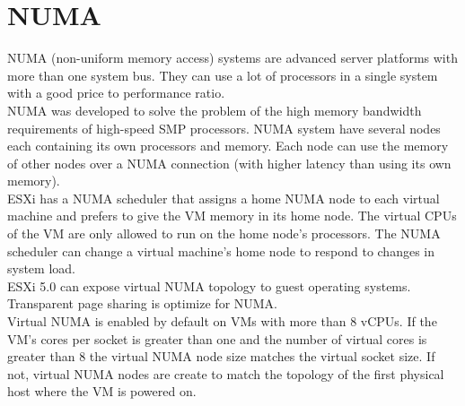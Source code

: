\section{NUMA}

NUMA (non-uniform memory access) systems are advanced server platforms with
more than one system bus. They can use a lot of processors in a single system
with a good price to performance ratio.\\

NUMA was developed to solve the problem of the high memory bandwidth
requirements of high-speed SMP processors. NUMA system have several nodes each
containing its own processors and memory. Each node can use the memory of
other nodes over a NUMA connection (with higher latency than using its own
memory).\\

ESXi has a NUMA scheduler that assigns a home NUMA node to each virtual
machine and prefers to give the VM memory in its home node. The virtual CPUs
of the VM are only allowed to run on the home node's processors. The NUMA
scheduler can change a virtual machine's home node to respond to changes
in system load.\\

ESXi 5.0 can expose virtual NUMA topology to guest operating systems.\\

Transparent page sharing is optimize for NUMA.\\

Virtual NUMA is enabled by default on VMs with more than 8 vCPUs. If
the VM's cores per socket is greater than one and the number of virtual cores
is greater than 8 the virtual NUMA node size matches the virtual socket size.
If not, virtual NUMA nodes are create to match the topology of the first
physical host where the VM is powered on.

